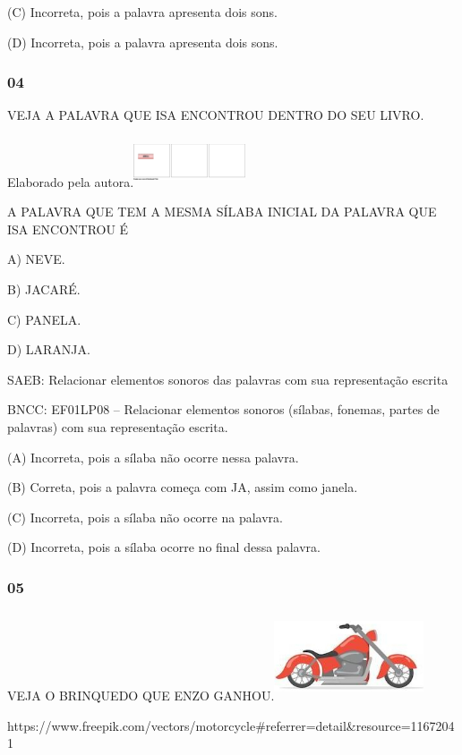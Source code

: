 (C) Incorreta, pois a palavra apresenta dois sons.

(D) Incorreta, pois a palavra apresenta dois sons.

\subsubsection{04}\label{section-76}

VEJA A PALAVRA QUE ISA ENCONTROU DENTRO DO SEU LIVRO.

Elaborado pela
autora.\includegraphics[width=1.29722in,height=0.57917in]{media/image244.png}

A PALAVRA QUE TEM A MESMA SÍLABA INICIAL DA PALAVRA QUE ISA ENCONTROU É

A) NEVE.

B) JACARÉ.

C) PANELA.

D) LARANJA.

SAEB: Relacionar elementos sonoros das palavras com sua representação escrita

BNCC: EF01LP08 -- Relacionar elementos sonoros (sílabas, fonemas, partes de
palavras) com sua representação escrita.

(A) Incorreta, pois a sílaba não ocorre nessa palavra.

(B) Correta, pois a palavra começa com JA, assim como janela.

(C) Incorreta, pois a sílaba não ocorre na palavra.

(D) Incorreta, pois a sílaba ocorre no final dessa palavra.\protect\hypertarget{_heading=h.33l0sngjt3hj}{}{}

\subsubsection{05}\label{section-77}

VEJA O BRINQUEDO QUE ENZO GANHOU.\includegraphics[width=1.73681in,height=1.03125in]{media/image245.jpg}

https://www.freepik.com/vectors/motorcycle\#referrer=detail\&resource=11672041

